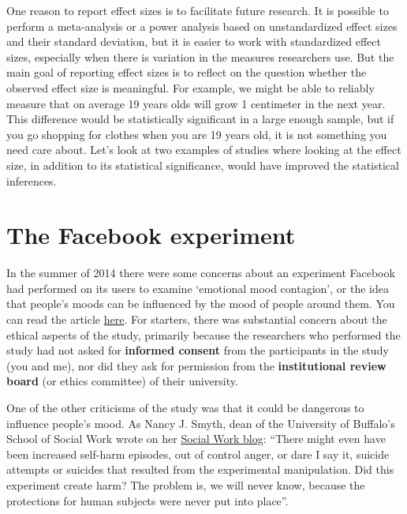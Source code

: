 \documentclass[
  oneside]{krantz}
\begin{document}
One reason to report effect sizes is to facilitate future research. It is possible to perform a meta-analysis or a power analysis based on unstandardized effect sizes and their standard deviation, but it is easier to work with standardized effect sizes, especially when there is variation in the measures researchers use. But the main goal of reporting effect sizes is to reflect on the question whether the observed effect size is meaningful. For example, we might be able to reliably measure that on average 19 years olds will grow 1 centimeter in the next year. This difference would be statistically significant in a large enough sample, but if you go shopping for clothes when you are 19 years old, it is not something you need care about. Let's look at two examples of studies where looking at the effect size, in addition to its statistical significance, would have improved the statistical inferences.

\hypertarget{the-facebook-experiment}{%
\section{The Facebook experiment}\label{the-facebook-experiment}}

In the summer of 2014 there were some concerns about an experiment Facebook had performed on its users to examine `emotional mood contagion', or the idea that people's moods can be influenced by the mood of people around them. You can read the article \href{http://www.pnas.org/content/111/24/8788.full}{here}. For starters, there was substantial concern about the ethical aspects of the study, primarily because the researchers who performed the study had not asked for \textbf{informed consent} from the participants in the study (you and me), nor did they ask for permission from the \textbf{institutional review board} (or ethics committee) of their university.

One of the other criticisms of the study was that it could be dangerous to influence people's mood. As Nancy J. Smyth, dean of the University of Buffalo's School of Social Work wrote on her \href{https://njsmyth.wordpress.com/2014/06/29/did-facebooks-secret-mood-manipulation-experiment-create-harm/}{Social Work blog}: ``There might even have been increased self-harm episodes, out of control anger, or dare I say it, suicide attempts or suicides that resulted from the experimental manipulation. Did this experiment create harm? The problem is, we will never know, because the protections for human subjects were never put into place''.
\end{document}

